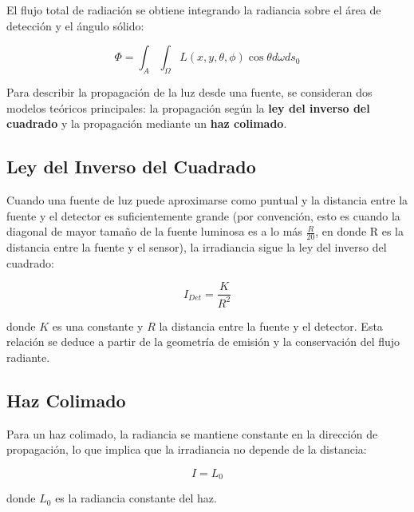 El flujo total de radiación se obtiene integrando la radiancia sobre el área de detección y el ángulo sólido:

\begin{mdframed}
\begin{equation}
\Phi = \int_A \int_{\Omega} L(x,y,\theta,\phi) \cos\theta d\omega ds_0
\end{equation}
\end{mdframed}

Para describir la propagación de la luz desde una fuente, se consideran dos modelos teóricos principales: la propagación según la \textbf{ley del inverso del cuadrado} y la propagación mediante un \textbf{haz colimado}.

\subsection{Ley del Inverso del Cuadrado}

Cuando una fuente de luz puede aproximarse como puntual y la distancia entre la fuente y el detector es suficientemente grande (por convención, esto es cuando la diagonal de mayor tamaño de la fuente luminosa es a lo más $\frac{R}{20}$, en donde R es la distancia entre la fuente y el sensor), la irradiancia sigue la ley del inverso del cuadrado:

\begin{mdframed}
\begin{equation}
I_{Det} = \frac{K}{R^2}
\end{equation}
\end{mdframed}

donde $K$ es una constante y $R$ la distancia entre la fuente y el detector. Esta relación se deduce a partir de la geometría de emisión y la conservación del flujo radiante.

\subsection{Haz Colimado}

Para un haz colimado, la radiancia se mantiene constante en la dirección de propagación, lo que implica que la irradiancia no depende de la distancia:

\begin{mdframed}
\begin{equation}
I = L_0
\end{equation}
\end{mdframed}

donde $L_0$ es la radiancia constante del haz.


